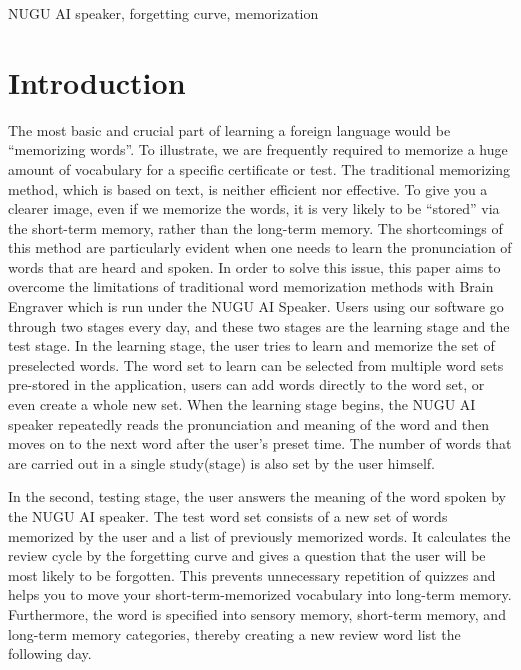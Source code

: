 \documentclass[conference]{IEEEtran}
\begin{document}
\begin{IEEEkeywords}
NUGU AI speaker, forgetting curve, memorization
\end{IEEEkeywords}

\section{Introduction}
The most basic and crucial part of learning a foreign language would be “memorizing words”. To illustrate, we are frequently required to memorize a huge amount of vocabulary for a specific certificate or test. The traditional memorizing method, which is based on text, is neither efficient nor effective. To give you a clearer image, even if we memorize the words, it is very likely to be “stored” via the short-term memory, rather than the long-term memory. The shortcomings of this method are particularly evident when one needs to learn the pronunciation of words that are heard and spoken. In order to solve this issue, this paper aims to overcome the limitations of traditional word memorization methods with Brain Engraver which is run under the NUGU AI Speaker. Users using our software go through two stages every day, and these two stages are the learning stage and the test stage. In the learning stage, the user tries to learn and memorize the set of preselected words. The word set to learn can be selected from multiple word sets pre-stored in the application, users can add words directly to the word set, or even create a whole new set. When the learning stage begins, the NUGU AI speaker repeatedly reads the pronunciation and meaning of the word and then moves on to the next word after the user’s preset time. The number of words that are carried out in a single study(stage) is also set by the user himself.  
In the second, testing stage, the user answers the meaning of the word spoken by the NUGU AI speaker. The test word set consists of a new set of words memorized by the user and a list of previously memorized words. It calculates the review cycle by the forgetting curve and gives a question that the user will be most likely to be forgotten. This prevents unnecessary repetition of quizzes and helps you to move your short-term-memorized vocabulary into long-term memory. Furthermore, the word is specified into sensory memory, short-term memory, and long-term memory categories, thereby creating a new review word list the following day.
\end{document}
